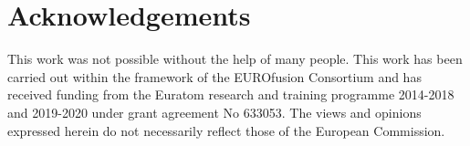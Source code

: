 \chapter{Acknowledgements}\label{sec:acknowledgement}
This work was not possible without the help of many people.
This work has been carried out within the framework of the EUROfusion Consortium and has received funding from the Euratom research and training programme 2014-2018 and 2019-2020 under grant agreement No 633053. 
The views and opinions expressed herein do not necessarily reflect those of the European Commission.
